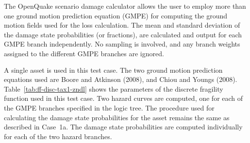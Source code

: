 The OpenQuake scenario damage calculator allows the user to employ more than one ground motion prediction equation (GMPE) for computing the ground motion fields used for the loss calculation. The mean and standard deviation of the damage state probabilities (or fractions), are calculated and output for each GMPE branch independently. No sampling is involved, and any branch weights assigned to the different GMPE branches are ignored.

A single asset is used in this test case. The two ground motion prediction equations used are Boore and Atkinson (2008), and Chiou and Youngs (2008). Table~\ref{tab:ff-disc-tax1-zndl} shows the parameters of the discrete fragility function used in this test case. Two hazard curves are computed, one for each of the GMPE branches specified in the logic tree. The procedure used for calculating the damage state probabilities for the asset remains the same as described in Case~1a. The damage state probabilities are computed individually for each of the two hazard branches.